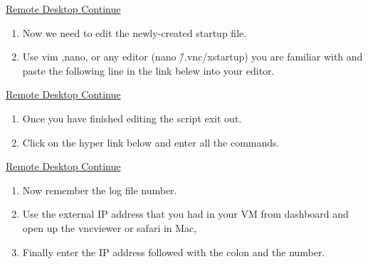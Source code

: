 \documentclass[12pt]{article}
\begin{document}
\begin{center}
\href{run:./Text_Files_14/Second.txt}{\Large Remote Desktop Continue}
\end{center}

\begin{enumerate}[resume]
  \item Now we need to edit the newly-created startup file.
  \item Use vim ,nano, or any editor (nano \~/.vnc/xstartup) you are familiar with and paste the following line in the link belew into your editor.
\end{enumerate}

\begin{center}
\href{run:./Text_Files_14/Third.txt}{\Large Remote Desktop Continue}
\end{center}

\begin{enumerate}[resume]
  \item Once you have finished editing the script exit out.
  \item Click on the hyper link below and enter all the commands.
\end{enumerate}

\begin{center}
\href{run:./Text_Files_14/Forth.txt}{\Large Remote Desktop Continue}
\end{center}

\begin{enumerate}[resume]
  \item Now remember the log file number.
  \item Use the external IP address that you had in your VM from dashboard and open up the vncviewer or safari in Mac,
  \item Finally enter the IP address followed with the colon and the number.
\end{enumerate}











%
%
\end{document}
